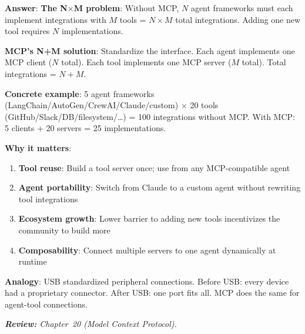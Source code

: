 \begin{questionbox}
\textbf{Answer}: \textbf{The N$\times$M problem}: Without MCP, $N$ agent frameworks must each implement integrations with $M$ tools = $N \times M$ total integrations. Adding one new tool requires $N$ implementations.

\textbf{MCP’s N+M solution}: Standardize the interface. Each agent implements one MCP client ($N$ total). Each tool implements one MCP server ($M$ total). Total integrations = $N + M$.

\textbf{Concrete example}: 5 agent frameworks (LangChain/AutoGen/CrewAI/Claude/custom) $\times$ 20 tools (GitHub/Slack/DB/filesystem/\ldots{}) = 100 integrations without MCP. With MCP: 5 clients + 20 servers = 25 implementations.

\textbf{Why it matters}:

\begin{enumerate}
  \item \textbf{Tool reuse}: Build a tool server once; use from any MCP-compatible agent
  \item \textbf{Agent portability}: Switch from Claude to a custom agent without rewriting tool integrations
  \item \textbf{Ecosystem growth}: Lower barrier to adding new tools incentivizes the community to build more
  \item \textbf{Composability}: Connect multiple servers to one agent dynamically at runtime
\end{enumerate}

\textbf{Analogy}: USB standardized peripheral connections. Before USB: every device had a proprietary connector. After USB: one port fits all. MCP does the same for agent-tool connections.

\emph{\textbf{Review:} Chapter~20 (Model Context Protocol).}
\end{questionbox}

